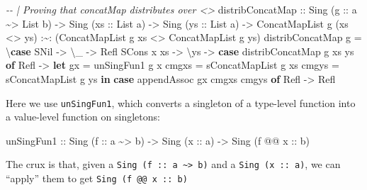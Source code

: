 \documentclass[]{article}
\newenvironment{Shaded}{}{}
\newcommand{\CommentTok}[1]{\textcolor[rgb]{0.38,0.63,0.69}{\textit{#1}}}
\newcommand{\DataTypeTok}[1]{\textcolor[rgb]{0.56,0.13,0.00}{#1}}
\newcommand{\KeywordTok}[1]{\textcolor[rgb]{0.00,0.44,0.13}{\textbf{#1}}}
\newcommand{\NormalTok}[1]{#1}
\newcommand{\OperatorTok}[1]{\textcolor[rgb]{0.40,0.40,0.40}{#1}}
\newcommand{\OtherTok}[1]{\textcolor[rgb]{0.00,0.44,0.13}{#1}}
\begin{document}
\begin{Shaded}
\begin{Highlighting}[]
\CommentTok{{-}{-} | Proving that concatMap distributes over <>}
\NormalTok{distribConcatMap}
\OtherTok{    ::} \DataTypeTok{Sing}\NormalTok{ (}\OtherTok{g ::}\NormalTok{ a }\OperatorTok{\textasciitilde{}>} \DataTypeTok{List}\NormalTok{ b)}
    \OtherTok{{-}>} \DataTypeTok{Sing}\NormalTok{ (}\OtherTok{xs ::} \DataTypeTok{List}\NormalTok{ a)}
    \OtherTok{{-}>} \DataTypeTok{Sing}\NormalTok{ (}\OtherTok{ys ::} \DataTypeTok{List}\NormalTok{ a)}
    \OtherTok{{-}>} \DataTypeTok{ConcatMapList}\NormalTok{ g (xs }\OperatorTok{<>}\NormalTok{ ys) }\OperatorTok{:\textasciitilde{}:}\NormalTok{ (}\DataTypeTok{ConcatMapList}\NormalTok{ g xs }\OperatorTok{<>} \DataTypeTok{ConcatMapList}\NormalTok{ g ys)}
\NormalTok{distribConcatMap g }\OtherTok{=}\NormalTok{ \textbackslash{}}\KeywordTok{case}
    \DataTypeTok{SNil} \OtherTok{{-}>}\NormalTok{ \textbackslash{}\_ }\OtherTok{{-}>} \DataTypeTok{Refl}
    \DataTypeTok{SCons}\NormalTok{ x xs }\OtherTok{{-}>}\NormalTok{ \textbackslash{}ys }\OtherTok{{-}>}
      \KeywordTok{case}\NormalTok{ distribConcatMap g xs ys }\KeywordTok{of}
        \DataTypeTok{Refl} \OtherTok{{-}>}
          \KeywordTok{let}\NormalTok{ gx    }\OtherTok{=}\NormalTok{ unSingFun1 g x}
\NormalTok{              cmgxs }\OtherTok{=}\NormalTok{ sConcatMapList g xs}
\NormalTok{              cmgys }\OtherTok{=}\NormalTok{ sConcatMapList g ys}
          \KeywordTok{in}  \KeywordTok{case}\NormalTok{ appendAssoc gx cmgxs cmgys }\KeywordTok{of}
                \DataTypeTok{Refl} \OtherTok{{-}>} \DataTypeTok{Refl}
\end{Highlighting}
\end{Shaded}

Here we use \texttt{unSingFun1}, which converts a singleton of a type-level
function into a value-level function on singletons:

\begin{Shaded}
\begin{Highlighting}[]
\NormalTok{unSingFun1}
\OtherTok{    ::} \DataTypeTok{Sing}\NormalTok{  (}\OtherTok{f      ::}\NormalTok{ a }\OperatorTok{\textasciitilde{}>}\NormalTok{ b)}
    \OtherTok{{-}>} \DataTypeTok{Sing}\NormalTok{  (}\OtherTok{x      ::}\NormalTok{ a)}
    \OtherTok{{-}>} \DataTypeTok{Sing}\NormalTok{  (f }\OperatorTok{@@}\OtherTok{ x ::}\NormalTok{ b)}
\end{Highlighting}
\end{Shaded}

The crux is that, given a
\texttt{Sing\ (f\ ::\ a\ \textasciitilde{}\textgreater{}\ b)} and a
\texttt{Sing\ (x\ ::\ a)}, we can ``apply'' them to get
\texttt{Sing\ (f\ @@\ x\ ::\ b)}
\end{document}

